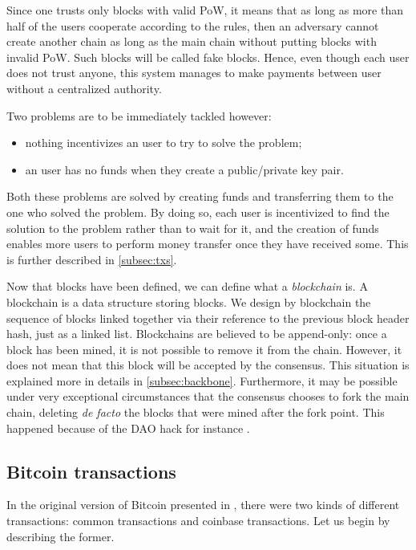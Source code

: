 \documentclass[11pt]{report}
\begin{document}
                Since one trusts only blocks with valid PoW, it means that as long as more than half of the users cooperate according to the rules, then an adversary cannot create another chain as long as the main chain without putting blocks with invalid PoW. Such blocks will be called fake blocks. Hence, even though each user does not trust anyone, this system manages to make payments between user without a centralized authority.
                
                Two problems are to be immediately tackled however:
                
                \begin{itemize}
                    \item nothing incentivizes an user to try to solve the problem;
                    \item an user has no funds when they create a public/private key pair.
                \end{itemize}
                
                Both these problems are solved by creating funds and transferring them to the one who solved the problem. By doing so, each user is incentivized to find the solution to the problem rather than to wait for it, and the creation of funds enables more users to perform money transfer once they have received some. This is further described in \autoref{subsec:txs}.
                
                Now that blocks have been defined, we can define what a \textit{blockchain} is. A blockchain is a data structure storing blocks. We design by blockchain the sequence of blocks linked together via their reference to the previous block header hash, just as a linked list. Blockchains are believed to be append-only: once a block has been mined, it is not possible to remove it from the chain. However, it does not mean that this block will be accepted by the consensus. This situation is explained more in details in \autoref{subsec:backbone}. Furthermore, it may be possible under very exceptional circumstances that the consensus chooses to fork the main chain, deleting \textit{de facto} the blocks that were mined after the fork point. This happened because of the DAO hack for instance \cite{DAO}.
            
            \subsection{Bitcoin transactions}
                \label{subsec:txs}
                In the original version of Bitcoin presented in \cite{Bitcoin}, there  were two kinds of different transactions: common transactions and coinbase transactions. Let us begin by describing the former.
                
\end{document}
